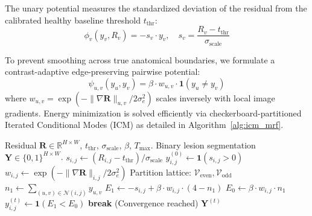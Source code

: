 \documentclass[conference]{IEEEtran}
\begin{document}
The unary potential measures the standardized deviation of the residual from the calibrated healthy baseline threshold $t_{\text{thr}}$:
\begin{equation}
\phi_v(y_v, R_v) = -s_v \cdot y_v, \quad s_v = \frac{R_v - t_{\text{thr}}}{\sigma_{\text{scale}}}
\end{equation}

To prevent smoothing across true anatomical boundaries, we formulate a contrast-adaptive edge-preserving pairwise potential:
\begin{equation}
\psi_{u, v}(y_u, y_v) = \beta \cdot w_{u, v} \cdot \mathbf{1}(y_u \ne y_v)
\end{equation}
where $w_{u, v} = \exp(-\|\nabla \mathbf{R}\|_{u, v} / 2\sigma_e^2)$ scales inversely with local image gradients. Energy minimization is solved efficiently via checkerboard-partitioned Iterated Conditional Modes (ICM) as detailed in Algorithm~\ref{alg:icm_mrf}.

\begin{algorithm}[!t]
\caption{Contrast-Adaptive Edge-Preserving Potts MRF}
\label{alg:icm_mrf}
\begin{algorithmic}[1]
\REQUIRE Residual $\mathbf{R} \in \mathbb{R}^{H \times W}$, $t_{\text{thr}}$, $\sigma_{\text{scale}}$, $\beta$, $T_{\text{max}}$.
\ENSURE Binary lesion segmentation $\mathbf{Y} \in \{0, 1\}^{H \times W}$.
\STATE $s_{i, j} \leftarrow (R_{i, j} - t_{\text{thr}}) / \sigma_{\text{scale}}$
\STATE $y_{i, j}^{(0)} \leftarrow \mathbf{1}(s_{i, j} > 0)$
\STATE $w_{i, j} \leftarrow \exp(-\|\nabla \mathbf{R}\|_{i, j} / 2\sigma_e^2)$
\STATE Partition lattice: $\mathcal{V}_{\text{even}}, \mathcal{V}_{\text{odd}}$
            \STATE $n_1 \leftarrow \sum_{(u, v) \in \mathcal{N}(i, j)} y_{u, v}$
            \STATE $E_1 \leftarrow -s_{i, j} + \beta \cdot w_{i, j} \cdot (4 - n_1)$
            \STATE $E_0 \leftarrow \beta \cdot w_{i, j} \cdot n_1$
            \STATE $y_{i, j}^{(t)} \leftarrow \mathbf{1}(E_1 < E_0)$
        \ENDFOR
    \ENDFOR
        \STATE \textbf{break} (Convergence reached)
    \ENDIF
\ENDFOR
\RETURN $\mathbf{Y}^{(t)}$
\end{algorithmic}
\end{algorithm}
\end{document}
